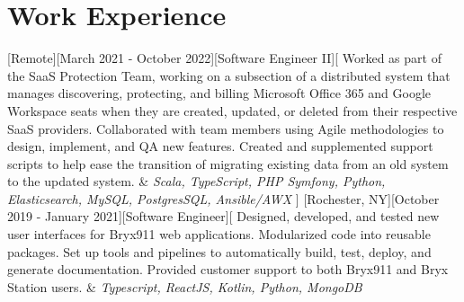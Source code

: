 \documentclass[showluaboxes=false]{resume}
\begin{document}
		\section{Work Experience} %
		[Remote][March 2021 - October 2022][Software Engineer II][%
		Worked as part of the SaaS Protection Team, working on a subsection of a distributed system that manages discovering, protecting, and billing Microsoft Office 365 and Google Workspace seats when they are created, updated, or deleted from their respective SaaS providers. %
		Collaborated with team members using Agile methodologies to design, implement, and QA new features. %
		Created and supplemented support scripts to help ease the transition of migrating existing data from an old system to the updated system.%
		&%
		{\it Scala, TypeScript, PHP Symfony, Python, Elasticsearch, MySQL, PostgresSQL, Ansible/AWX\nolinebreak}%
% 
		]%
		[Rochester, NY][October 2019 - January 2021][Software Engineer][%
		Designed, developed, and tested new user interfaces for Bryx911 web applications. %
		Modularized code into reusable packages. %
		Set up tools and pipelines to automatically build, test, deploy, and generate documentation. %
		Provided customer support to both Bryx911 and Bryx Station users.%
		&%
		{\it Typescript, ReactJS, Kotlin, Python, MongoDB}%
\end{document}

